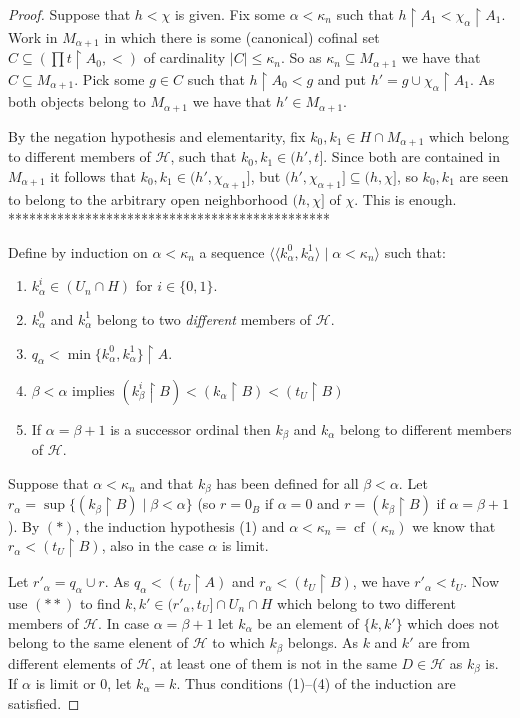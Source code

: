 \documentclass{amsart}
\theoremstyle{remark}
\DeclareMathOperator{\cf}{cf}
\renewcommand\mid{\mathrel{|}\allowbreak}
\begin{document}
\begin{proof}
Suppose that $h<\chi$ is given. Fix some $\alpha<\kappa_n$ such that $h\restriction A_1 < \chi_\alpha\restriction A_1$. Work in $M_{\alpha+1}$ in which there is some (canonical) cofinal set $C\subseteq (\prod t\restriction A_0,<)$ of cardinality $|C|\le \kappa_n$. So as
$\kappa_n\subseteq M_{\alpha+1}$ we have that $C\subseteq M_{\alpha+1}$. Pick some $g\in C$ such that $h\restriction A_0<g$ and put $h'=g\cup \chi_\alpha\restriction A_1$. As both objects belong to $M_{\alpha+1}$ we have that $h'\in M_{\alpha+1}$.

By the negation hypothesis and elementarity, fix $k_0,k_1\in H\cap M_{\alpha+1}$ which belong
to different members of $\mathcal H$, such that $k_0,k_1\in (h',t]$. Since both are contained in $M_{\alpha+1}$ it follows that $k_0,k_1\in (h',\chi_{\alpha+1}]$, 
but $(h',\chi_{\alpha+1}]\subseteq (h,\chi]$, so $k_0,k_1$ are seen to belong to the arbitrary
open neighborhood $(h,\chi]$ of $\chi$. This is enough. 
**********************************************

Define by induction on \(\alpha<\kappa_{n}\) a sequence \(\langle \langle k_{\alpha}^0,k_\alpha^1\rangle\mid \alpha<\kappa_n\rangle\)  such that:

\begin{enumerate}
  \item \(k_{\alpha}^i\in (U_{n}\cap H)\) for $i\in\{0,1\}$. 
  \item $k_\alpha^0$ and $k_\alpha^1$ belong to two \emph{different} members of $\mathcal H$.
  \item $q_\alpha<\min\{k_\alpha^0,k_\alpha^1\}\restriction A$.
        \item \(\beta<\alpha\) implies
        \((k_{\beta}^i\restriction B)<(k_{\alpha}\restriction B)<(t_{U}\restriction B)\)
        \item If \(\alpha=\beta+1\) is a successor ordinal then \(k_{\beta}\) and \(k_{\alpha}\) belong to different
        members of \(\mathcal H\).
\end{enumerate}


Suppose that \(\alpha<\kappa_{n}\) and that \(k_{\beta}\) has been defined for all \(\beta<\alpha\).
Let \(r_{\alpha}=\sup\{(k_{\beta}\restriction B)\mid \beta<\alpha\}\) (so \(r=0_{B}\) if \(\alpha=0\) and
\(r=(k_{\beta}\restriction B)\) if \(\alpha=\beta+1\)). By \((*)\), the induction hypothesis
(1)  and \(\alpha<\kappa_{n}=\cf(\kappa_n)\) we know
that \(r_{\alpha}<(t_{U}\restriction B)\), also in the case \(\alpha\) is limit.

Let \(r'_{\alpha}=q_{\alpha} \cup r\). As \(q_{\alpha}<(t_{U}\restriction A)\) and
\(r_{\alpha}<(t_{U}\restriction B)\), we have \(r'_{\alpha}<t_{U}\).
Now use \((**)\) to find \(k,k'\in (r'_{\alpha},t_{U}]\cap U_{n}\cap H\) which belong to two
different members of \(\mathcal H\). In case \(\alpha=\beta+1\) let \(k_{\alpha}\) be an
element of \(\{k,k'\}\) which does not belong to the same elenent of
\(\mathcal H\) to which \(k_{\beta}\) belongs. As \(k\) and \(k'\) are from different
elements of \(\mathcal H\), at least one of them  is not  in the same \(D\in \mathcal H\) as
\(k_{\beta}\) is. If \(\alpha\) is limit or \(0\), let \(k_{\alpha}=k\). Thus conditions (1)--(4)
of the induction are satisfied.



\end{proof}
\end{document}
